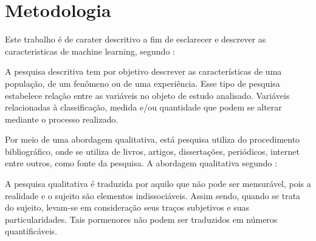 \chapter{Metodologia}
\label{chap:metodologia}

Este trabalho é de carater descritivo a fim de esclarecer e descrever as caracteristicas de machine learning, 
segundo \cite{descritiva}:

\begin{citacao} 
 A pesquisa descritiva tem por objetivo descrever as características de uma população, de um fenômeno ou de uma experiência. 
 Esse tipo de pesquisa estabelece relação entre as variáveis no objeto de estudo analisado. 
 Variáveis relacionadas à classificação, medida e/ou quantidade que podem se alterar mediante o processo realizado.  
\end{citacao} 


Por meio de uma abordagem qualitativa, está pesquisa utiliza do procedimento bibliográfico, onde se utiliza de livros, 
artigos, dissertações, periódicos, internet entre outros, como fonte da pesquisa. A abordagem qualitativa segundo \cite{qualitativa} :

\begin{citacao}
A pesquisa qualitativa é traduzida por aquilo que não pode ser mensurável, pois a realidade e o sujeito são elementos indissociáveis. 
Assim sendo, quando se trata do sujeito, levam-se em consideração seus traços subjetivos e suas particularidades. 
Tais pormenores não podem ser traduzidos em números quantificáveis.
\end{citacao}